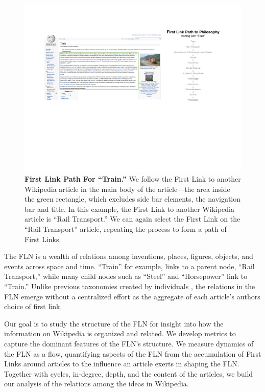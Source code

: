\documentclass[11pt]{report}
\begin{document}
\begin{figure}[tp!]
  \includegraphics[width=\textwidth]{graphics/Train.pdf}  
  \caption{
    \textbf{First Link Path For ``Train.''}
    We follow the First Link to another Wikipedia article
    in the main body of the article---the area
    inside the green rectangle, which excludes 
    side bar elements, the navigation bar and title. 
    In this example, the First Link to another Wikipedia article is ``Rail Transport.'' 
    We can again select the First Link on the ``Rail Transport''
    article, repeating the process to 
    form a path of First Links.
  }
  \label{fig:Train First Links}
\end{figure}

The FLN is a wealth of relations among inventions, places,
figures, objects, and events across space and time.
``Train'' for example, links to a parent node, ``Rail Transport,''
while many child nodes such as ``Steel'' and ``Horsepower'' link to ``Train.''
Unlike previous taxonomies created by individuals
\cite{locke, descartes, aristotle, hist_thesaurus},
the relations in the FLN emerge without a centralized effort 
as the aggregate of each article's authors choice of first link.

Our goal is to study the structure of the FLN for insight into how the information on Wikipedia is organized and related.
We develop metrics to capture 
the dominant features of the FLN's structure.
We measure dynamics of the FLN as a flow, quantifying 
aspects of the FLN from the accumulation of First Links around articles 
to the influence an article exerts in shaping the FLN.
Together with cycles, in-degree, depth, and the content of the articles, 
we build our analysis of the relations among the ideas in Wikipedia.
\end{document}
